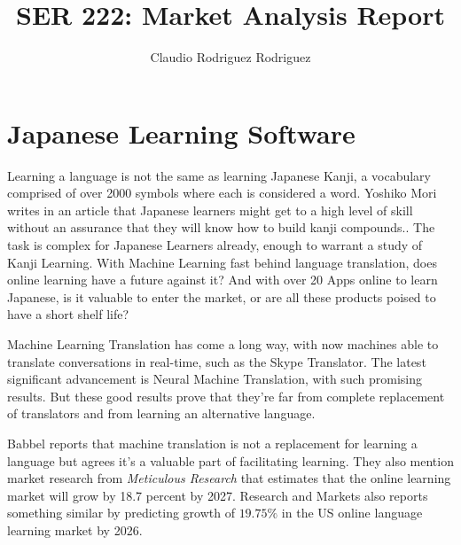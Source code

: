 \documentclass{article}
\begin{document}
\title{SER 222: Market Analysis Report}
\author{Claudio Rodriguez Rodriguez}
\maketitle







\section{Japanese Learning Software}

Learning a language is not the same as learning Japanese Kanji, a vocabulary comprised of over 2000 symbols where each is considered a word. Yoshiko Mori writes in an article that Japanese learners might get to a high level of skill without an assurance that they will know how to build kanji compounds.\cite{mori2012five}. The task is complex for Japanese Learners already, enough to warrant a study of Kanji Learning. With Machine Learning fast behind language translation, does online learning have a future against it? And with over 20 Apps online to learn Japanese, is it valuable to enter the market, or are all these products poised to have a short shelf life?

Machine Learning Translation has come a long way, with now machines able to translate conversations in real-time, such as the Skype Translator.\cite{ser222:skype} The latest significant advancement is Neural Machine Translation, with such promising results. But these good results prove that they're far from complete replacement of translators and from learning an alternative language.\cite{castilho2017neural} 

Babbel reports that machine translation is not a replacement for learning a language but agrees it's a valuable part of facilitating learning. They also mention market research from \textit{Meticulous Research} that estimates that the online learning market will grow by 18.7 percent by 2027.\cite{ser222:babbel} Research and Markets also reports something similar by predicting growth of $19.75\%$ in the US online language learning market by 2026.\cite{ser222:onlinemarker} 
\end{document}
